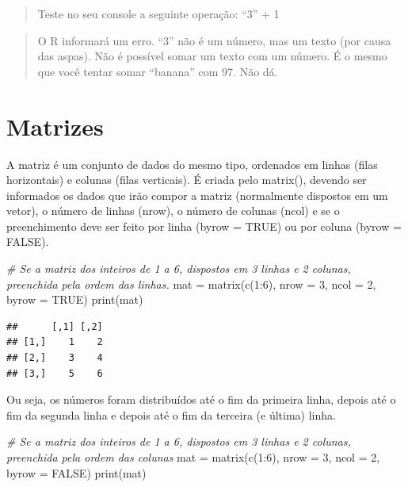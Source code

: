 \documentclass[
]{book}
\newenvironment{Shaded}{\begin{snugshade}}{\end{snugshade}}
\newcommand{\AttributeTok}[1]{\textcolor[rgb]{0.77,0.63,0.00}{#1}}
\newcommand{\CommentTok}[1]{\textcolor[rgb]{0.56,0.35,0.01}{\textit{#1}}}
\newcommand{\ConstantTok}[1]{\textcolor[rgb]{0.00,0.00,0.00}{#1}}
\newcommand{\DecValTok}[1]{\textcolor[rgb]{0.00,0.00,0.81}{#1}}
\newcommand{\FunctionTok}[1]{\textcolor[rgb]{0.00,0.00,0.00}{#1}}
\newcommand{\NormalTok}[1]{#1}
\newcommand{\OtherTok}[1]{\textcolor[rgb]{0.56,0.35,0.01}{#1}}
\newcommand{\SpecialCharTok}[1]{\textcolor[rgb]{0.00,0.00,0.00}{#1}}
\begin{document}
\begin{quote}
Teste no seu console a seguinte operação: ``3'' + 1
\end{quote}

\begin{quote}
O R informará um erro. ``3'' não é um número, mas um texto (por causa das aspas). Não é possível somar um texto com um número. É o mesmo que você tentar somar ``banana'' com 97. Não dá.
\end{quote}

\hypertarget{matrizes}{%
\section{Matrizes}\label{matrizes}}

A matriz é um conjunto de dados do mesmo tipo, ordenados em linhas (filas horizontais) e colunas (filas verticais). É criada pelo matrix(), devendo ser informados os dados que irão compor a matriz (normalmente dispostos em um vetor), o número de linhas (nrow), o número de colunas (ncol) e se o preenchimento deve ser feito por linha (byrow = TRUE) ou por coluna (byrow = FALSE).

\begin{Shaded}
\begin{Highlighting}[]
\CommentTok{\# Se a matriz dos inteiros de 1 a 6, dispostos em 3 linhas e 2 colunas, preenchida pela ordem das linhas.}
\NormalTok{mat }\OtherTok{=} \FunctionTok{matrix}\NormalTok{(}\FunctionTok{c}\NormalTok{(}\DecValTok{1}\SpecialCharTok{:}\DecValTok{6}\NormalTok{), }\AttributeTok{nrow =} \DecValTok{3}\NormalTok{, }\AttributeTok{ncol =} \DecValTok{2}\NormalTok{, }\AttributeTok{byrow =} \ConstantTok{TRUE}\NormalTok{)}
\FunctionTok{print}\NormalTok{(mat)}
\end{Highlighting}
\end{Shaded}

\begin{verbatim}
##      [,1] [,2]
## [1,]    1    2
## [2,]    3    4
## [3,]    5    6
\end{verbatim}

Ou seja, os números foram distribuídos até o fim da primeira linha, depois até o fim da segunda linha e depois até o fim da terceira (e última) linha.

\begin{Shaded}
\begin{Highlighting}[]
\CommentTok{\# Se a matriz dos inteiros de 1 a 6, dispostos em 3 linhas e 2 colunas, preenchida pela ordem das colunas}
\NormalTok{mat }\OtherTok{=} \FunctionTok{matrix}\NormalTok{(}\FunctionTok{c}\NormalTok{(}\DecValTok{1}\SpecialCharTok{:}\DecValTok{6}\NormalTok{), }\AttributeTok{nrow =} \DecValTok{3}\NormalTok{, }\AttributeTok{ncol =} \DecValTok{2}\NormalTok{, }\AttributeTok{byrow =} \ConstantTok{FALSE}\NormalTok{)}
\FunctionTok{print}\NormalTok{(mat)}
\end{Highlighting}
\end{Shaded}
\end{document}
